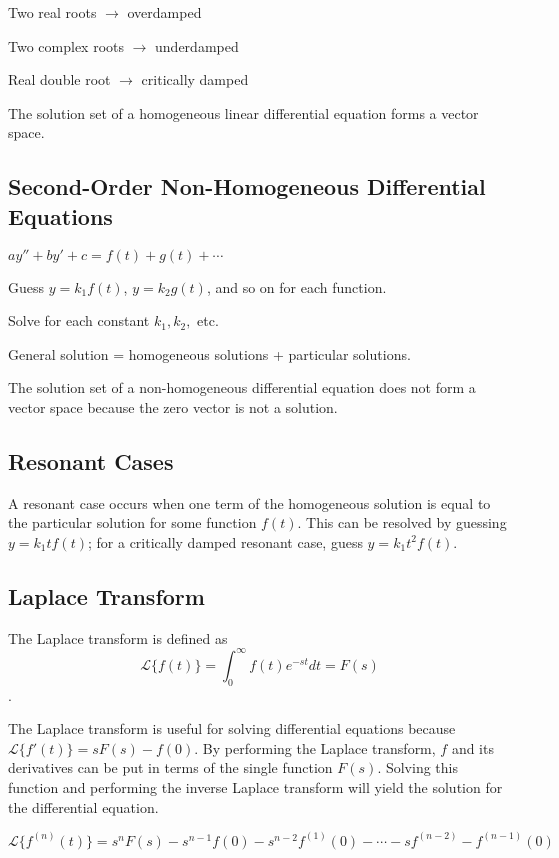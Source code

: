 Two real roots $\rightarrow$ overdamped

Two complex roots $\rightarrow$ underdamped

Real double root $\rightarrow$ critically damped

The solution set of a homogeneous linear differential equation forms a vector space.

\subsection{Second-Order Non-Homogeneous Differential Equations}

$ay'' + b y' + c = f(t) + g(t) + \cdots$

Guess $y=k_{1}f(t)$, $y=k_{2}g(t)$, and so on for each function.

Solve for each constant $k_{1}, k_{2},$ etc.

General solution = homogeneous solutions + particular solutions.

The solution set of a non-homogeneous differential equation does not form a vector space because the zero vector is not a solution.

\subsection{Resonant Cases}

A resonant case occurs when one term of the homogeneous solution is equal to the particular solution for some function $f(t)$. This can be resolved by guessing $y = k_{1}tf(t)$; for a critically damped resonant case, guess $y = k_{1}t^{2}f(t)$.

\subsection{Laplace Transform}

The Laplace transform is defined as $$\mathscr{L}\{f(t)\} = \int_{0}^{\infty}  f(t)e^{-st} dt = F(s)$$.

The Laplace transform is useful for solving differential equations because $\mathscr{L}\{f'(t)\} = sF(s) - f(0)$. By performing the Laplace transform, $f$ and its derivatives can be put in terms of the single function $F(s)$. Solving this function and performing the inverse Laplace transform will yield the solution for the differential equation.

$$\mathscr{L}\{f^{(n)}(t)\} = s^{n}F(s) - s^{n-1}f(0) - s^{n-2}f^{(1)}(0) - \cdots - sf^{(n-2)} - f^{(n-1)}(0)$$

